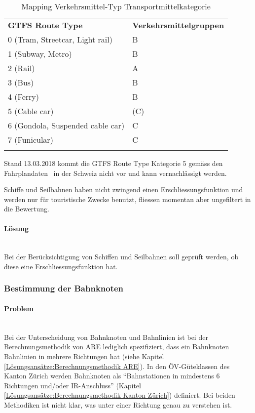 \begin{longtable}[ht]{l l}
        \midrule
        \textbf{GTFS Route Type} 
                                & \textbf{Verkehrsmittelgruppen}\\
        0 (Tram, Streetcar, Light rail)
                                & B\\
        1 (Subway, Metro)
                                & B\\
        2 (Rail)
                                & A\\
        3 (Bus)
                                & B\\
        4 (Ferry)
                                & B\\
        5 (Cable car)
                                & (C)\\
        6 (Gondola, Suspended cable car)
                                & C\\
        7 (Funicular)
                                & C\\            
        \bottomrule
    \caption{Mapping Verkehrsmittel-Typ Transportmittelkategorie}
    \label{table:Mapping Verkehrsmittel-Typ Transportmittelkategorie}
\end{longtable}

Stand 13.03.2018 kommt die GTFS Route Type Kategorie 5 gemäss den Fahrplandaten~\cite{geops_fahrplandaten} in der Schweiz nicht vor und kann vernachlässigt werden.

Schiffe und Seilbahnen haben nicht zwingend einen Erschliessungsfunktion und werden nur für touristische Zwecke benutzt, fliessen momentan aber ungefiltert in die Bewertung.


\paragraph{Lösung}~\\
Bei der Berücksichtigung von Schiffen und Seilbahnen soll geprüft werden, ob diese eine Erschliessungsfunktion hat.

\subsubsection{Bestimmung der Bahnknoten}
\label{Verbesserungsmöglichkeiten:Bestimmung der Bahnknoten}

\paragraph{Problem}~\\
Bei der Unterscheidung von Bahnknoten und Bahnlinien ist bei der Berechnungsmethodik von ARE lediglich spezifiziert, dass ein Bahnknoten Bahnlinien in mehrere Richtungen hat (siehe Kapitel \ref{Lösungsansätze:Berechnungsmethodik ARE}).
In den ÖV-Güteklassen des Kanton Zürich werden Bahnknoten als "`Bahnstationen in mindestens 6 Richtungen und/oder IR-Anschluss"' (Kapitel \ref{Lösungsansätze:Berechnungsmethodik Kanton Zürich}) definiert.
Bei beiden Methodiken ist nicht klar, was unter einer Richtung genau zu verstehen ist.

